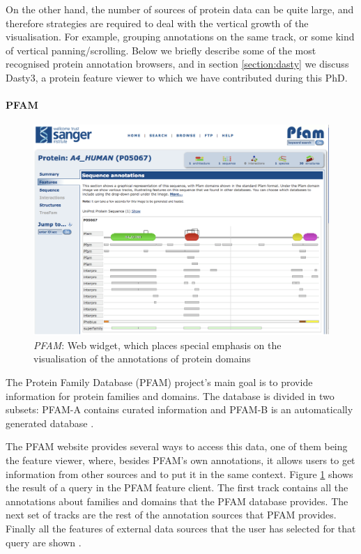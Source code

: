 On the other hand, the number of sources of protein data can be quite large, and therefore strategies are required to deal with the vertical growth of the visualisation. For example, grouping annotations on the same track, or some kind of vertical panning/scrolling. Below we briefly describe some of the most recognised protein annotation browsers, and in section \ref{section:dasty} we discuss Dasty3, a protein feature viewer to which we have contributed during this PhD.

\paragraph{PFAM} 

\begin{figure}[ht]
\centering
\includegraphics[width=6in]{figures/pfam.png} 
\caption[PFAM Snapshot] {\emph{PFAM}: Web widget, which places special emphasis on the visualisation of the annotations of protein domains} \label{fig: pfam}
\end{figure}

The Protein Family Database (PFAM) project's main goal is to provide information for protein families and domains. The database is divided in two subsets: PFAM-A contains curated information and PFAM-B is an automatically generated database \cite{FIN2008}. 

The PFAM website provides several ways to access this data, one of them being the feature viewer, where, besides PFAM's own annotations, it allows users to get information from other sources and to put it in the same context. Figure \ref{fig: pfam} shows the result of a query in the PFAM feature client. The first track contains all the annotations about families and domains that the PFAM database provides. The next set of tracks are the rest of the annotation sources that PFAM provides. Finally all the features of external data sources that the user has selected for that query are shown \cite{FIN2008}.

